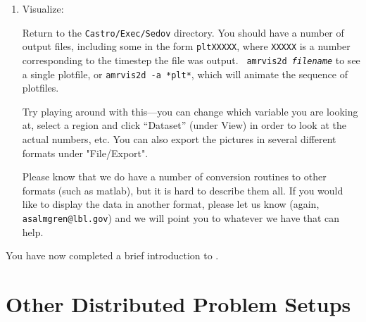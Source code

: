 \begin{enumerate}
\item Visualize:

  Return to the {\tt Castro/Exec/Sedov} directory.  You should
  have a number of output files, including some in the form {\tt *pltXXXXX},
  where {\tt XXXXX} is a number corresponding to the timestep the file
  was output.  {\tt
    amrvis2d {\em filename}} to see a single plotfile, or {\tt amrvis2d -a
  *plt*}, which will animate the sequence of plotfiles.

  Try playing
  around with this---you can change which variable you are
  looking at, select a region and click ``Dataset'' (under View)
  in order to look at the actual numbers, etc. You can also export the
  pictures in several different formats under "File/Export".

Please know that we do have a number of conversion routines to other
formats (such as matlab), but it is hard to describe them all. If you
would like to display the data in another format, please let us know
(again, {\tt asalmgren@lbl.gov}) and we will point you to whatever we have
that can help.

\end{enumerate}

You have now completed a brief introduction to \castro. 


\section{Other Distributed Problem Setups}

